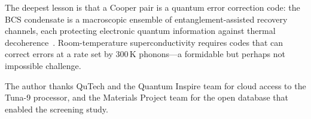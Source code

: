 \documentclass[prb,twocolumn,superscriptaddress,longbibliography,floatfix]{revtex4-2}
\begin{document}
The deepest lesson is that a Cooper pair is a quantum error
correction code: the BCS condensate is a macroscopic ensemble
of entanglement-assisted recovery channels, each protecting
electronic quantum information against thermal
decoherence~\cite{Huang2026,Huang2026exp}.  Room-temperature
superconductivity requires codes that can correct errors at
a rate set by $300\,$K phonons---a formidable but perhaps not
impossible challenge.

\begin{acknowledgments}
The author thanks QuTech and the Quantum Inspire team for cloud
access to the Tuna-9 processor, and the Materials Project team
for the open database that enabled the screening study.
\end{acknowledgments}

\end{document}
